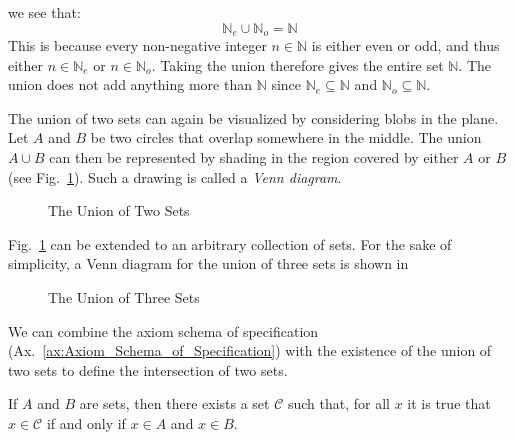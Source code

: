         we see that:
        \begin{equation}
            \mathbb{N}_{e}\cup\mathbb{N}_{o}=\mathbb{N}
        \end{equation}
        This is because every non-negative integer $n\in\mathbb{N}$ is
        either even or odd, and thus either $n\in\mathbb{N}_{e}$ or
        $n\in\mathbb{N}_{o}$. Taking the union therefore gives the entire
        set $\mathbb{N}$. The union does not add anything more than
        $\mathbb{N}$ since $\mathbb{N}_{e}\subseteq\mathbb{N}$ and
        $\mathbb{N}_{o}\subseteq\mathbb{N}$.
        \par\hfill\par
        The union of two sets can again be visualized by considering blobs
        in the plane. Let $A$ and $B$ be two circles that overlap somewhere in
        the middle. The union $A\cup{B}$ can then be represented by shading in
        the region covered by either $A$ or $B$
        (see Fig.~\ref{fig:Union_of_Two_Sets}). Such a drawing is called a
        \textit{Venn diagram}.
        \begin{figure}[H]
            \centering
            \captionsetup{type=figure}
            
            \caption{The Union of Two Sets}
            \label{fig:Union_of_Two_Sets}
        \end{figure}
        Fig.~\ref{fig:Union_of_Two_Sets} can be extended to an
        arbitrary collection of sets. For the sake of simplicity, a Venn
        diagram for the union of three sets is shown in
        \begin{figure}[H]
            \centering
            \captionsetup{type=figure}
            
            \caption{The Union of Three Sets}
            \label{fig:Union_of_Three_Sets}
        \end{figure}
        We can combine the axiom schema of specification
        (Ax.~\ref{ax:Axiom_Schema_of_Specification}) with the existence of
        the union of two sets to define the intersection of two sets.
        \begin{theorem}
            If $A$ and $B$ are sets, then there exists a set $\mathcal{C}$
            such that, for all $x$ it is true that $x\in\mathcal{C}$ if and
            only if $x\in{A}$ and $x\in{B}$.
        \end{theorem}
